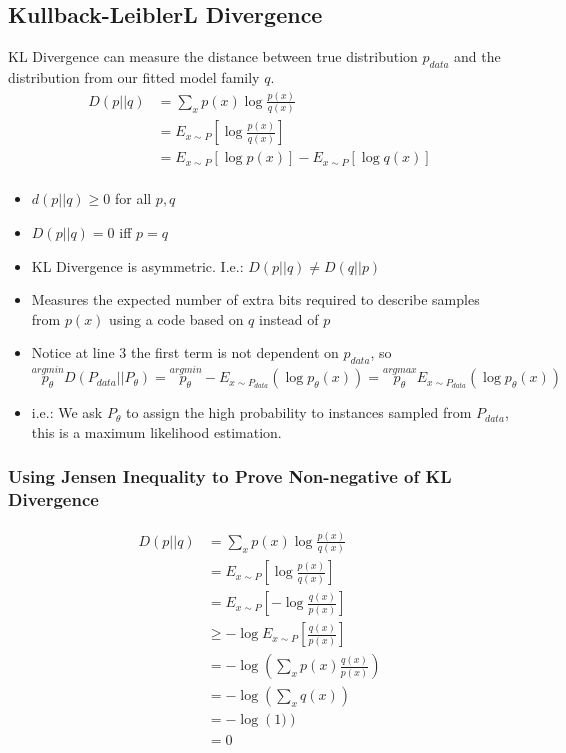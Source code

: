 \subsection{Kullback-LeiblerL Divergence}
KL Divergence can measure the distance between true distribution $p_{data}$ and the distribution from our fitted model family $q$. 
    \begin{align*}
        D(p||q) 
        & = \sum_{x} p(x) \log \frac{p(x)}{q(x)}\\
        &= E_{x\sim P}\left [ \log \frac{p(x)}{q(x)} \right ]\\
        &= E_{x\sim P}\left [ \log p(x) \right] - E_{x\sim P}\left[\log q(x) \right ]\\
    \end{align*}
    \begin{itemize}
        \item $d(p || q) \geq 0$ for all $p, q$
        \item $D(p||q) = 0$ iff $p = q$
        \item KL Divergence is asymmetric. I.e.: $D(p||q) \neq D(q||p)$
        \item Measures the expected number of extra bits required to describe samples from $p(x)$ using a code based on $q$ instead of $p$
        \item Notice at line 3 the first term is not dependent on $p_{data}$, so $\overset{argmin}{p_\theta} D(P_{data}||P_\theta)  =  \overset{argmin}{p_\theta} - E_{x \sim P_{data}}(\log p_\theta(x)) =  \overset{argmax}{p_\theta} E_{x \sim P_{data}}(\log p_\theta(x))$
        \item i.e.: We ask $P_{\theta}$ to assign the high probability to instances sampled from $P_{data}$, this is a maximum likelihood estimation. 
    \end{itemize}
\subsubsection{Using Jensen Inequality to Prove Non-negative of KL Divergence} 
    \begin{align*}
        D(p||q) 
        & = \sum_{x} p(x) \log \frac{p(x)}{q(x)}\\
        &= E_{x\sim P}\left [ \log \frac{p(x)}{q(x)} \right ] \\
        &= E_{x\sim P}\left [ -\log \frac{q(x)}{p(x)} \right ] \\
        &\geq - \log E_{x\sim P}\left [\frac{q(x)}{p(x)} \right ] \tag{Concavity of Log function} \\
        &= - \log \left(    \sum_x p(x) \frac{q(x)}{p(x)}   \right) \\
        &= - \log \left(    \sum_x q(x)  \right) \\
        &= - \log \left( 1)  \right) \\
        &= 0
    \end{align*}

